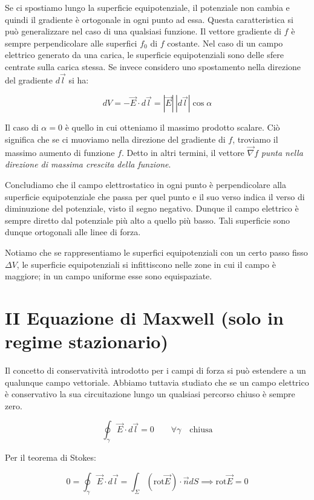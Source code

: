 Se ci spostiamo lungo la superficie equipotenziale, il potenziale non cambia e quindi il gradiente è ortogonale in ogni punto ad essa. Questa caratteristica si può generalizzare nel caso di una qualsiasi funzione. Il vettore gradiente di $f$ è sempre perpendicolare alle superfici $f_0$ di $f$ costante.
Nel caso di un campo elettrico generato da una carica, le superficie equipotenziali sono delle sfere centrate sulla carica stessa.
Se invece considero uno spostamento nella direzione del gradiente $d\vec{l}$ si ha:

\[
	dV = -\vec{E} \cdot d\vec{l} = |\vec{E}|\,|d\vec{l}|\cos \alpha
\]

Il caso di $ \alpha =0 $ è quello in cui otteniamo il massimo prodotto scalare. Ciò significa che se ci muoviamo nella direzione del gradiente di $f$, troviamo il massimo aumento di funzione $f$. Detto in altri termini, il vettore $ \vec{\nabla} f $ \emph{punta nella direzione di massima crescita della funzione}.

Concludiamo che il campo elettrostatico in ogni punto è perpendicolare alla superficie equipotenziale che passa per quel punto e il suo verso indica il verso di diminuzione del potenziale, visto il segno negativo. Dunque il campo elettrico è sempre diretto dal potenziale più alto a quello più basso. Tali superficie sono dunque ortogonali alle linee di forza.

Notiamo che se rappresentiamo le superfici equipotenziali con un certo passo fisso $ \Delta V $, le superficie equipotenziali si infittiscono nelle zone in cui il campo è maggiore; in un campo uniforme esse sono equispaziate.

\section{II Equazione di Maxwell (solo in regime stazionario)}

Il concetto di conservatività introdotto per i campi di forza si può estendere a un qualunque campo vettoriale. Abbiamo tuttavia studiato che se un campo elettrico è conservativo la sua circuitazione lungo un qualsiasi percorso chiuso è sempre zero.

\[
	\oint_{\gamma} \vec{E} \cdot d\vec{l} = 0 \qquad \forall \gamma \quad \text{chiusa}
\]

Per il teorema di Stokes:

\[
	0 = \oint_{\gamma} \vec{E} \cdot d\vec{l} =\int_{\Sigma}(\text{rot}\vec{E} )\cdot \vec{n} dS \implies \boxed{\text{rot}\vec{E} = 0}
\]


